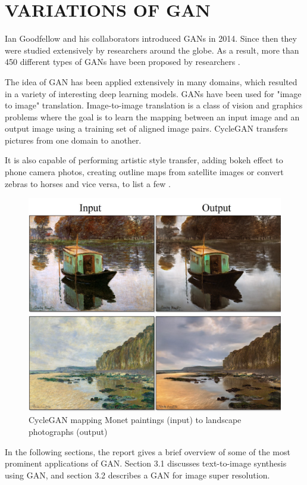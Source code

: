 \chapter{VARIATIONS OF GAN}
\begin{onehalfspace}
    Ian Goodfellow and his collaborators introduced GANs in 2014. Since then 
    they were studied extensively by researchers around the globe. As a result, 
    more than 450 different types of GANs have been proposed by 
    researchers \cite{gan_list}. 

    The idea of GAN has been applied extensively in many domains, which 
    resulted in a variety of interesting deep learning models. GANs have been 
    used for "image to image" translation. Image-to-image translation is a 
    class of vision and graphics problems where the goal is to learn the 
    mapping between an input image and an output image using a training set of 
    aligned image pairs. CycleGAN \cite{CycleGAN2017} transfers pictures from 
    one domain to another. 
    
    It is also capable of performing artistic style transfer, adding bokeh 
    effect to phone camera photos, creating outline maps from satellite images 
    or convert zebras to horses and vice versa, to list a few 
    \cite{cycleganprojectpage}.

    \begin{figure}[h]
        \centering
        \includegraphics[width=0.6\linewidth]{images/painting2photo.jpg}
        \caption{CycleGAN mapping Monet paintings (input) to landscape photographs (output)
        \cite{cycleganprojectpage}}
    \end{figure} 

    In the following sections, the report gives a brief overview of 
    some of the most prominent applications of GAN. Section 3.1 discusses 
    text-to-image synthesis using GAN, and section 3.2 describes a GAN for 
    image super resolution.


\end{onehalfspace}
